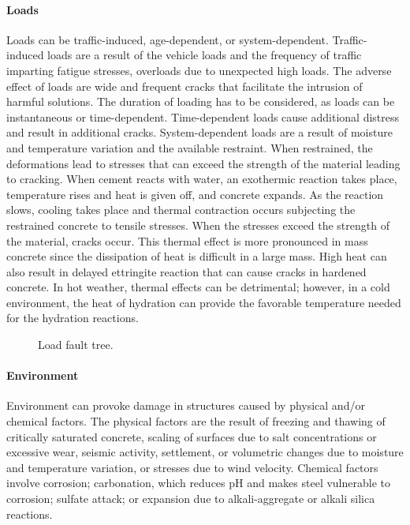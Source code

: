 \paragraph{Loads}
Loads can be traffic-induced, age-dependent, or system-dependent. Traffic-induced loads are a result of the
vehicle loads and the frequency of traffic imparting fatigue stresses, overloads due to unexpected high loads. The
adverse effect of loads are wide and frequent cracks that facilitate the intrusion of harmful solutions. The duration of
loading has to be considered, as loads can be instantaneous or time-dependent. Time-dependent loads cause
additional distress and result in additional cracks. System-dependent loads are a result of moisture and temperature
variation and the available restraint. When restrained, the deformations lead to stresses that can exceed the strength
of the material leading to cracking. When cement reacts with water, an exothermic reaction takes place, temperature
rises and heat is given off, and concrete expands. As the reaction slows, cooling takes place and thermal contraction
occurs subjecting the restrained concrete to tensile stresses. When the stresses exceed the strength of the material,
cracks occur. This thermal effect is more pronounced in mass concrete since the dissipation of heat is difficult in a
large mass. High heat can also result in delayed ettringite reaction that can cause cracks in hardened concrete. In
hot weather, thermal effects can be detrimental; however, in a cold environment, the heat of hydration can provide
the favorable temperature needed for the hydration reactions.

\begin{figure}
  \caption{Load fault tree.}\label{fig:fault-tree-load} 
\end{figure}
\paragraph{Environment}
Environment can provoke damage in structures caused by physical and/or chemical factors. The physical factors
are the result of freezing and thawing of critically saturated concrete, scaling of surfaces due to salt concentrations or
excessive wear, seismic activity, settlement, or volumetric changes due to moisture and temperature variation, or
stresses due to wind velocity. Chemical factors involve corrosion; carbonation, which reduces pH and makes steel
vulnerable to corrosion; sulfate attack; or expansion due to alkali-aggregate or alkali silica reactions.

